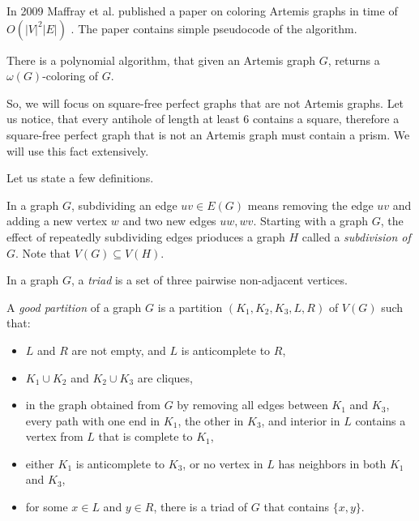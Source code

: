 In 2009 Maffray et al. published a paper on coloring Artemis graphs in time of $O(|V|^2|E|)$ \cite{coloringArtemis}. The paper contains simple pseudocode of the algorithm.

\begin{theorem}{\cite{coloringArtemis}}
  \label{thm:colorArtemis}
  There is a polynomial algorithm, that given an Artemis graph $G$, returns a $\omega(G)$-coloring of $G$.
\end{theorem}

So, we will focus on square-free perfect graphs that are not Artemis graphs. Let us notice, that every antihole of length at least 6 contains a square, therefore a square-free perfect graph that is not an Artemis graph must contain a prism. We will use this fact extensively.

Let us state a few definitions.

\begin{defnTwo}[subdivision]
  In a graph $G$, subdividing an edge $uv \in E(G)$ means removing the edge $uv$ and adding a new vertex $w$ and two new edges $uw, wv$. Starting with a graph $G$, the effect of repeatedly subdividing edges prioduces a graph $H$ called a \emph{subdivision of $G$}. Note that $V(G) \subseteq V(H)$.
\end{defnTwo}

\begin{defnTwo}[triad]
  In a graph $G$, a \emph{triad} is a set of three pairwise non-adjacent vertices.
\end{defnTwo}

\begin{defnTwo}
  A \emph{good partition} of a graph $G$ is a partition $(K_1, K_2, K_3, L, R)$ of $V(G)$ such that:
  \begin{itemize}
    \item $L$ and $R$ are not empty, and $L$ is anticomplete to $R$,
    \item $K_1 \cup K_2$ and $K_2 \cup K_3$ are cliques,
    \item in the graph obtained from $G$ by removing all edges between $K_1$ and $K_3$, every path with one end in $K_1$, the other in $K_3$, and interior in $L$ contains a vertex from $L$ that is complete to $K_1$,
    \item either $K_1$ is anticomplete to $K_3$, or no vertex in $L$ has neighbors in both $K_1$ and $K_3$,
    \item for some $x \in L$ and $y \in R$, there is a triad of $G$ that contains $\{x, y\}$.
  \end{itemize}
\end{defnTwo}

